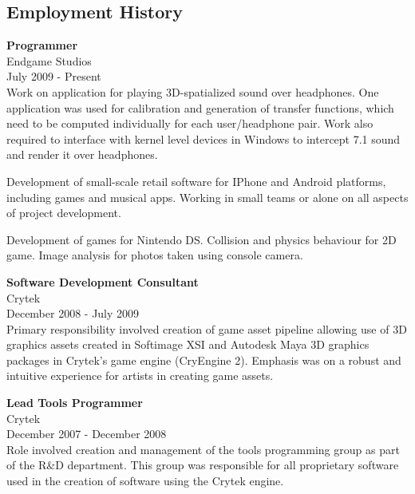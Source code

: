 \documentclass{res}
\begin{document}
 
\thispagestyle{empty} %
\address{120 Rose St\\
Fitzroy, VIC 3065\\
+61 (0) 421 487 249}

\begin{resume}
\vspace{0.1in}
 
\section{Employment History} 
\vspace{0.1in} 
	{\bf Programmer} \\
	Endgame Studios \\
	July 2009 - Present \\

	Work on application for playing 3D-spatialized sound over headphones.
	One application was used for calibration and generation of transfer functions,
	which need to be computed individually for each user/headphone pair. Work also
	required to interface with kernel level devices in Windows to intercept 7.1
	sound and render it over headphones.

	Development of small-scale retail software for IPhone and Android platforms,
	including games and musical apps. Working in small teams or alone on all
	aspects of project development.

	Development of games for Nintendo DS. Collision and physics behaviour for 2D
	game. Image analysis for photos taken using console camera.

	{\bf Software Development Consultant} \\
	Crytek \\
	December 2008 - July 2009 \\

	Primary responsibility involved creation of game asset pipeline
	allowing use of 3D graphics assets created in Softimage XSI and Autodesk Maya
	3D graphics packages in Crytek's game engine (CryEngine 2). Emphasis was on
	a robust and intuitive experience for artists in creating game assets.

	{\bf Lead Tools Programmer} \\
	Crytek \\
	December 2007 - December 2008 \\

	Role involved creation and management of the tools programming group as
	part of the R\&D department. This group was responsible for all proprietary
	software used in the creation of software using the Crytek engine.


\end{resume}
\end{document}
